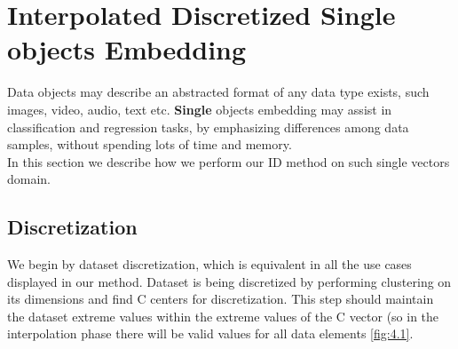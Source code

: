
\chapter{Interpolated Discretized Single objects Embedding} %

\label{Chapter4} %




Data objects may describe an abstracted format of any data type exists, such images, video, audio, text etc.
\textbf{Single} objects embedding may assist in classification and regression tasks, by emphasizing differences among data samples, without spending lots of time and memory.
\\
In this section we describe how we perform our ID method on such single vectors domain.



\section{Discretization}

We begin by dataset discretization, which is equivalent in all the use cases displayed in our method.
Dataset is being discretized by performing clustering on its dimensions and find C centers for discretization. This step should maintain the dataset extreme values within the extreme values of the C vector (so in the interpolation phase there will be valid values for all data elements \ref{fig:4.1}.


